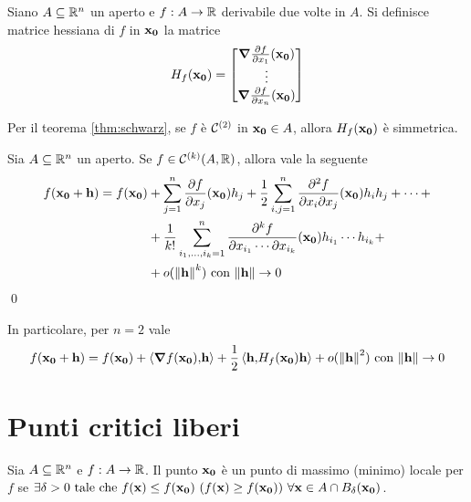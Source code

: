 \begin{definition}
    Siano $A \subseteq \mathbb{R}^n$ un aperto e $f: A \to \mathbb{R}$ derivabile due volte in $A$. Si definisce matrice hessiana di $f$ in $\vb{x_0}$ la matrice
    $$
        H_f(\vb{x_0}) =
        \begin{bmatrix}
            \grad \frac{\partial f}{\partial x_1}(\vb{x_0})\\
            \vdots\\
            \grad \frac{\partial f}{\partial x_n}(\vb{x_0})
        \end{bmatrix}
    $$
\end{definition}

\begin{remark}
    Per il teorema \ref{thm:schwarz}, se $f$ è $\mathcal{C}^{(2)}$ in $\vb{x_0} \in A$, allora $H_f(\vb{x_0})$ è simmetrica.
\end{remark}

\begin{theorem}
    Sia $A \subseteq \mathbb{R}^n$ un aperto. Se $f \in \mathcal{C}^{(k)}(A, \mathbb{R})$, allora vale la seguente
    \begin{align*}
        f(\vb{x_0}+ \vb{h})= f(\vb{x_0})&+\sum_{j=1}^{n}\frac{\partial f}{\partial x_j}(\vb{x_0})h_j + \frac{1}{2}\sum_{i,j=1}^{n}\frac{\partial^2 f}{\partial x_i \partial x_j}(\vb{x_0})h_ih_j+\cdots+\\
        &+\frac{1}{k!}\sum_{i_1,\dots,i_k=1}^n\frac{\partial^k f}{\partial x_{i_1}\cdots\partial x_{i_k}}(\vb{x_0})h_{i_1}\cdots h_{i_k} +\\
        &+o (\norm{\vb{h}}^k) \text{ con } \norm{\vb{h}} \to 0
    \end{align*}
    \qed
\end{theorem}

\begin{remark}
    In particolare, per $n=2$ vale
    $$
        f(\vb{x_0} + \vb{h}) = f(\vb{x_0})+\left\langle\grad f(\vb{x_0}){,}\vb{h}\right\rangle + \frac{1}{2}\left\langle\vb{h}{,}H_f(\vb{x_0})\vb{h}\right\rangle+o(\norm{\vb{h}}^2) \text{ con } \norm{\vb{h}} \to 0
    $$
\end{remark}

\section{Punti critici liberi}

\begin{definition}
    \label{def:minmax}
    Sia $A \subseteq \mathbb{R}^n$ e $f: A \to \mathbb{R}$. Il punto $\vb{x_0}$ è un punto di massimo (minimo) locale per $f$ se $\exists \delta > 0 \text{ tale che } f(\vb{x}) \leq f(\vb{x_0})\ (f(\vb{x})\geq f(\vb{x_0})) \ \forall \vb{x} \in A \cap B_\delta (\vb{x_0})$.
\end{definition}

